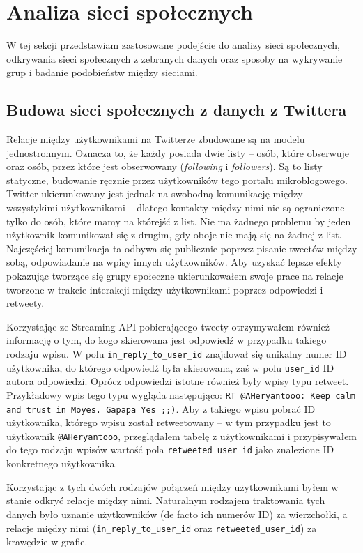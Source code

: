 \section{Analiza sieci społecznych}
\label{section:siecispoleczne}
W tej sekcji przedstawiam zastosowane podejście do analizy sieci społecznych,
odkrywania sieci społecznych z zebranych danych oraz sposoby na wykrywanie grup
i badanie podobieństw między sieciami.
\subsection{Budowa sieci społecznych z danych z Twittera}
Relacje między użytkownikami na Twitterze zbudowane są na modelu jednostronnym.
Oznacza to, że każdy posiada dwie listy -- osób, które obserwuje oraz osób,
przez które jest obserwowany (\textit{following} i \textit{followers}).
Są to listy statyczne, budowanie ręcznie przez użytkowników tego portalu
mikroblogowego. Twitter ukierunkowany jest jednak na swobodną komunikację między
wszystykimi użytkownikami -- dlatego kontakty między nimi nie są ograniczone
tylko do osób, które mamy na którejść z list. Nie ma żadnego problemu by jeden
użytkownik komunikował się z drugim, gdy oboje nie mają się na żadnej z list.
Najczęściej komunikacja ta odbywa się publicznie poprzez pisanie tweetów między
sobą, odpowiadanie na wpisy innych użytkowników. Aby uzyskać lepsze efekty
pokazując tworzące się grupy społeczne ukierunkowałem swoje prace na relacje
tworzone w trakcie interakcji między użytkownikami poprzez odpowiedzi i
retweety.

Korzystając ze Streaming API pobierającego tweety otrzymywałem również
informację o tym, do kogo skierowana jest odpowiedź w przypadku takiego rodzaju
wpisu.
W polu \texttt{in\_reply\_to\_user\_id} znajdował się unikalny numer ID
użytkownika, do którego odpowiedź była skierowana, zaś w polu \texttt{user\_id}
ID autora odpowiedzi. 
Oprócz odpowiedzi istotne również były wpisy typu retweet. Przykładowy wpis tego
typu wygląda następująco: \texttt{RT @AHeryantooo: Keep calm and trust in Moyes. Gapapa Yes ;;)}.
Aby z takiego wpisu pobrać ID użytkownika, którego wpisu został retweetowany -- w tym
przypadku jest to użytkownik \texttt{@AHeryantooo}, przeglądałem tabelę z użytkownikami
i przypisywałem do tego rodzaju wpisów wartość pola \texttt{retweeted\_user\_id}
jako znalezione ID konkretnego użytkownika.

Korzystając z tych dwóch rodzajów połączeń między użytkownikami byłem w stanie 
odkryć relacje między nimi. Naturalnym rodzajem traktowania tych danych było
uznanie użytkowników (de facto ich numerów ID) za wierzchołki, a relacje między nimi
(\texttt{in\_reply\_to\_user\_id} oraz \texttt{retweeted\_user\_id}) za krawędzie
w grafie.


